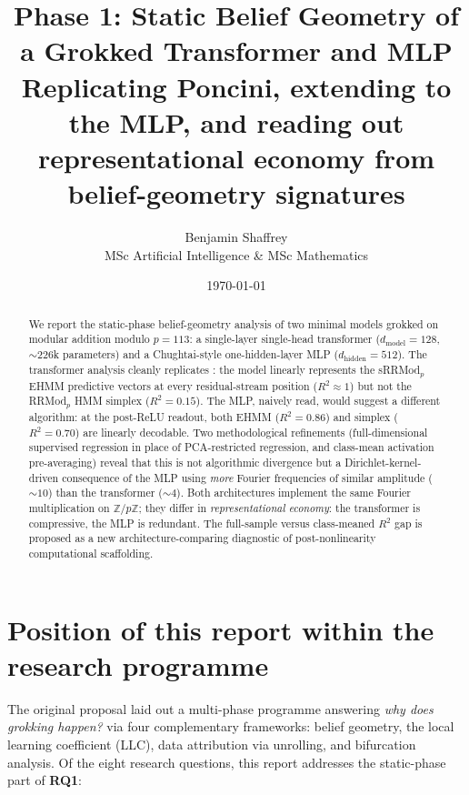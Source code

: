 \documentclass[11pt,a4paper]{article}
\title{\textbf{Phase 1: Static Belief Geometry of a Grokked Transformer and MLP} \\
\large Replicating Poncini, extending to the MLP, and reading out\\
representational economy from belief-geometry signatures}
\author{Benjamin Shaffrey \\
MSc Artificial Intelligence \& MSc Mathematics}
\date{\today}
\begin{document}
\maketitle

\begin{abstract}
We report the static-phase belief-geometry analysis of two minimal models grokked on modular addition modulo $p = 113$: a single-layer single-head transformer ($d_{\mathrm{model}} = 128$, ${\sim}226$k parameters) and a Chughtai-style one-hidden-layer MLP ($d_{\mathrm{hidden}} = 512$). The transformer analysis cleanly replicates \citet{poncini2025compmech}: the model linearly represents the sRRMod$_p$ EHMM predictive vectors at every residual-stream position ($R^2 \approx 1$) but not the RRMod$_p$ HMM simplex ($R^2 = 0.15$). The MLP, naively read, would suggest a different algorithm: at the post-ReLU readout, both EHMM ($R^2 = 0.86$) and simplex ($R^2 = 0.70$) are linearly decodable. Two methodological refinements (full-dimensional supervised regression in place of PCA-restricted regression, and class-mean activation pre-averaging) reveal that this is not algorithmic divergence but a Dirichlet-kernel-driven consequence of the MLP using \emph{more} Fourier frequencies of similar amplitude (${\sim}10$) than the transformer (${\sim}4$). Both architectures implement the same Fourier multiplication on $\mathbb{Z}/p\mathbb{Z}$; they differ in \emph{representational economy}: the transformer is compressive, the MLP is redundant. The full-sample versus class-meaned $R^2$ gap is proposed as a new architecture-comparing diagnostic of post-nonlinearity computational scaffolding.
\end{abstract}

\tableofcontents
\newpage

\section{Position of this report within the research programme}

The original proposal \citep{phase0_v2} laid out a multi-phase programme answering \emph{why does grokking happen?} via four complementary frameworks: belief geometry, the local learning coefficient (LLC), data attribution via unrolling, and bifurcation analysis. Of the eight research questions, this report addresses the static-phase part of \textbf{RQ1}:
\end{document}
